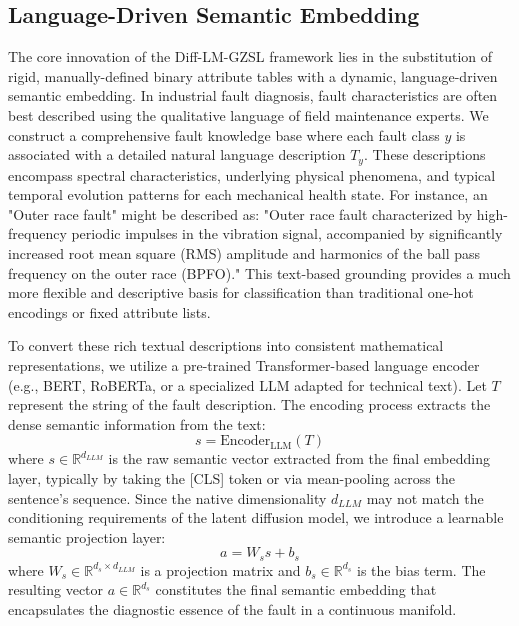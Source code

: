 \subsection{Language-Driven Semantic Embedding}
\label{sec:semantic}
The core innovation of the Diff-LM-GZSL framework lies in the substitution of rigid, manually-defined binary attribute tables with a dynamic, language-driven semantic embedding. In industrial fault diagnosis, fault characteristics are often best described using the qualitative language of field maintenance experts. We construct a comprehensive fault knowledge base where each fault class $y$ is associated with a detailed natural language description $T_y$. These descriptions encompass spectral characteristics, underlying physical phenomena, and typical temporal evolution patterns for each mechanical health state. For instance, an "Outer race fault" might be described as: "Outer race fault characterized by high-frequency periodic impulses in the vibration signal, accompanied by significantly increased root mean square (RMS) amplitude and harmonics of the ball pass frequency on the outer race (BPFO)." This text-based grounding provides a much more flexible and descriptive basis for classification than traditional one-hot encodings or fixed attribute lists.

To convert these rich textual descriptions into consistent mathematical representations, we utilize a pre-trained Transformer-based language encoder (e.g., BERT, RoBERTa, or a specialized LLM adapted for technical text). Let $T$ represent the string of the fault description. The encoding process extracts the dense semantic information from the text:
\begin{equation}
s = \text{Encoder}_{\text{LLM}}(T)
\end{equation}
where $s \in \mathbb{R}^{d_{LLM}}$ is the raw semantic vector extracted from the final embedding layer, typically by taking the [CLS] token or via mean-pooling across the sentence's sequence. Since the native dimensionality $d_{LLM}$ may not match the conditioning requirements of the latent diffusion model, we introduce a learnable semantic projection layer:
\begin{equation}
a = W_s s + b_s
\end{equation}
where $W_s \in \mathbb{R}^{d_s \times d_{LLM}}$ is a projection matrix and $b_s \in \mathbb{R}^{d_s}$ is the bias term. The resulting vector $a \in \mathbb{R}^{d_s}$ constitutes the final semantic embedding that encapsulates the diagnostic essence of the fault in a continuous manifold.

